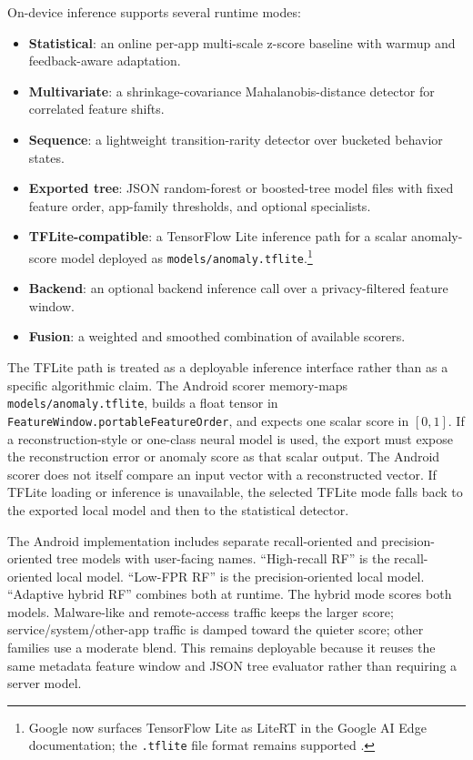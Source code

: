 On-device inference supports several runtime modes:
\begin{itemize}[leftmargin=*]
  \item \textbf{Statistical}: an online per-app multi-scale z-score baseline with warmup and
  feedback-aware adaptation.
  \item \textbf{Multivariate}: a shrinkage-covariance Mahalanobis-distance detector for correlated
  feature shifts.
  \item \textbf{Sequence}: a lightweight transition-rarity detector over bucketed behavior states.
  \item \textbf{Exported tree}: JSON random-forest or boosted-tree model files with fixed feature
  order, app-family thresholds, and optional specialists.
  \item \textbf{TFLite-compatible}: a TensorFlow Lite inference path for a scalar anomaly-score
  model deployed as \texttt{models/anomaly.tflite}.\footnote{Google now surfaces TensorFlow Lite as
  LiteRT in the Google AI Edge documentation; the \texttt{.tflite} file format remains supported
  \citep{tensorflow_lite_litert_2024}.}
  \item \textbf{Backend}: an optional backend inference call over a privacy-filtered feature
  window.
  \item \textbf{Fusion}: a weighted and smoothed combination of available scorers.
\end{itemize}

The TFLite path is treated as a deployable inference interface rather than as a specific
algorithmic claim. The Android scorer memory-maps \texttt{models/anomaly.tflite}, builds a float
tensor in \texttt{FeatureWindow.portableFeatureOrder}, and expects one scalar score in \([0,1]\). If
a reconstruction-style or one-class neural model is used, the export must expose the reconstruction
error or anomaly score as that scalar output. The Android scorer does not itself compare an input
vector with a reconstructed vector. If TFLite loading or inference is unavailable, the selected
TFLite mode falls back to the exported local model and then to the statistical detector.

The Android implementation includes separate recall-oriented and precision-oriented tree models
with user-facing names. ``High-recall RF'' is the recall-oriented local model. ``Low-FPR RF'' is the
precision-oriented local model. ``Adaptive hybrid RF'' combines both at runtime. The hybrid mode
scores both models. Malware-like and remote-access traffic
keeps the larger score; service/system/other-app traffic is damped toward the quieter score; other
families use a moderate blend. This remains deployable because it reuses the same metadata feature
window and JSON tree evaluator rather than requiring a server model.

